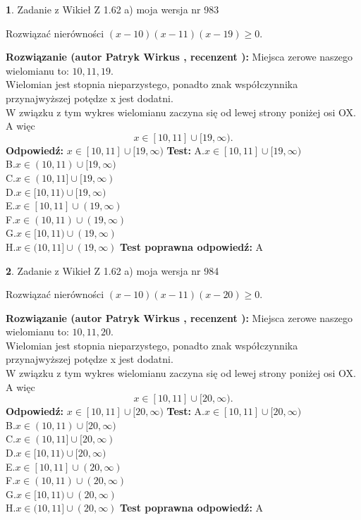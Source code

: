 \documentclass[12pt, a4paper]{article}
\theoremstyle{definition} %
\newtheorem{zad}{}
\newcommand{\zadStart}[1]{\begin{zad}#1\newline}
\newcommand{\zadStop}{\end{zad}}
\newcommand{\rozwStart}[2]{\noindent \textbf{Rozwiązanie (autor #1 , recenzent #2): }\newline}
\newcommand{\rozwStop}{\newline}
\newcommand{\odpStart}{\noindent \textbf{Odpowiedź:}\newline}
\newcommand{\odpStop}{\newline}
\newcommand{\testStart}{\noindent \textbf{Test:}\newline}
\newcommand{\testStop}{\newline}
\newcommand{\kluczStart}{\noindent \textbf{Test poprawna odpowiedź:}\newline}
\newcommand{\kluczStop}{\newline}
\begin{document}
\zadStart{Zadanie z Wikieł Z 1.62 a) moja wersja nr 983}

Rozwiązać nierówności $(x-10)(x-11)(x-19)\ge0$.
\zadStop
\rozwStart{Patryk Wirkus}{}
Miejsca zerowe naszego wielomianu to: $10, 11, 19$.\\
Wielomian jest stopnia nieparzystego, ponadto znak współczynnika przy\linebreak najwyższej potędze x jest dodatni.\\ W związku z tym wykres wielomianu zaczyna się od lewej strony poniżej osi OX. A więc $$x \in [10,11] \cup [19,\infty).$$
\rozwStop
\odpStart
$x \in [10,11] \cup [19,\infty)$
\odpStop
\testStart
A.$x \in [10,11] \cup [19,\infty)$\\
B.$x \in (10,11) \cup [19,\infty)$\\
C.$x \in (10,11] \cup [19,\infty)$\\
D.$x \in [10,11) \cup [19,\infty)$\\
E.$x \in [10,11] \cup (19,\infty)$\\
F.$x \in (10,11) \cup (19,\infty)$\\
G.$x \in [10,11) \cup (19,\infty)$\\
H.$x \in (10,11] \cup (19,\infty)$
\testStop
\kluczStart
A
\kluczStop



\zadStart{Zadanie z Wikieł Z 1.62 a) moja wersja nr 984}

Rozwiązać nierówności $(x-10)(x-11)(x-20)\ge0$.
\zadStop
\rozwStart{Patryk Wirkus}{}
Miejsca zerowe naszego wielomianu to: $10, 11, 20$.\\
Wielomian jest stopnia nieparzystego, ponadto znak współczynnika przy\linebreak najwyższej potędze x jest dodatni.\\ W związku z tym wykres wielomianu zaczyna się od lewej strony poniżej osi OX. A więc $$x \in [10,11] \cup [20,\infty).$$
\rozwStop
\odpStart
$x \in [10,11] \cup [20,\infty)$
\odpStop
\testStart
A.$x \in [10,11] \cup [20,\infty)$\\
B.$x \in (10,11) \cup [20,\infty)$\\
C.$x \in (10,11] \cup [20,\infty)$\\
D.$x \in [10,11) \cup [20,\infty)$\\
E.$x \in [10,11] \cup (20,\infty)$\\
F.$x \in (10,11) \cup (20,\infty)$\\
G.$x \in [10,11) \cup (20,\infty)$\\
H.$x \in (10,11] \cup (20,\infty)$
\testStop
\kluczStart
A
\kluczStop
\end{document}
